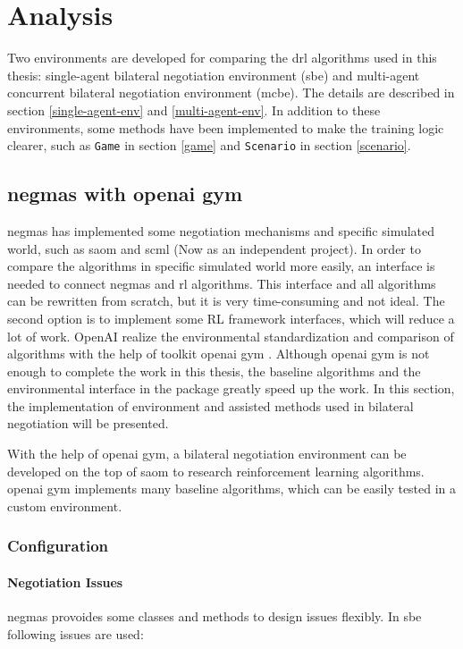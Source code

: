 \chapter{Analysis}
Two environments are developed for comparing the \gls{drl} algorithms used in this thesis: single-agent bilateral negotiation environment (\gls{sbe}) and multi-agent concurrent bilateral negotiation environment (\gls{mcbe}). The details are described in section \ref{single-agent-env} and \ref{multi-agent-env}. In addition to these environments, some methods have been implemented to make the training logic clearer, such as \texttt{Game} in section \ref{game} and \texttt{Scenario} in section \ref{scenario}.

\section{\gls{negmas} with \gls{openai gym}}
\gls{negmas} has implemented some negotiation mechanisms and specific simulated world, such as \gls{saom} and \gls{scml} (Now as an independent project). In order to compare the algorithms in specific simulated world more easily, an interface is needed to connect \gls{negmas} and \gls{rl} algorithms. This interface and all algorithms can be rewritten from scratch, but it is very time-consuming and not ideal. The second option is to implement some RL framework interfaces, which will reduce a lot of work. OpenAI realize the environmental standardization and comparison of algorithms with the help of toolkit \gls{openai gym} \parencite{brockman2016openai}. Although \gls{openai gym} is not enough to complete the work in this thesis, the baseline algorithms and the environmental interface in the package greatly speed up the work. In this section, the implementation of environment and assisted methods used in bilateral negotiation will be presented.

With the help of \gls{openai gym},  a bilateral negotiation environment can be developed on the top of \gls{saom} to research reinforcement learning algorithms. \gls{openai gym} implements many baseline algorithms, which can be easily tested in a custom environment.

\subsection{Configuration}
\subsubsection{Negotiation Issues}
\gls{negmas} provoides some classes and methods to design issues flexibly. In \gls{sbe} following issues are used:
 
